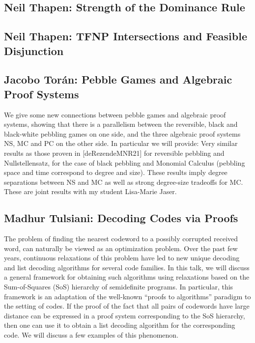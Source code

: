 \documentclass[11pt]{article}
\begin{document}
\subsection*{Neil Thapen: Strength of the Dominance Rule}\label{Thapen2}


\subsection*{Neil Thapen: TFNP Intersections and Feasible Disjunction}\label{Thapen1}

\subsection*{Jacobo Tor\'{a}n: Pebble Games and Algebraic Proof Systems}\label{Toran}

We give some new connections between pebble games and algebraic proof systems, showing that there is a parallelism between the reversible, black and black-white pebbling games on one side, and the three algebraic proof systems NS, MC and PC on the other side. In particular we will provide: Very similar results as those proven in [deRezendeMNR21] for reversible pebbling and Nullstellensatz, for the case of black pebbling and Monomial Calculus (pebbling space and time correspond to degree and size). These results imply degree separations between NS and MC as well as strong degree-size tradeoffs for MC. These are joint results with my student Lisa-Marie Jaser.


\subsection*{Madhur Tulsiani: Decoding Codes via Proofs}\label{Tulsiani}

The problem of finding the nearest codeword to a possibly corrupted received word, can naturally be viewed as an optimization problem. Over the past few years, continuous relaxations of this problem have led to new unique decoding and list decoding algorithms for several code families. In this talk, we will discuss a general framework for obtaining such algorithms using relaxations based on the Sum-of-Squares (SoS) hierarchy of semidefinite programs. In particular, this framework is an adaptation of the well-known “proofs to algorithms” paradigm to the setting of codes. If the proof of the fact that all pairs of codewords have large distance can be expressed in a proof system corresponding to the SoS hierarchy, then one can use it to obtain a list decoding algorithm for the corresponding code. We will discuss a few examples of this phenomenon.
\end{document}
